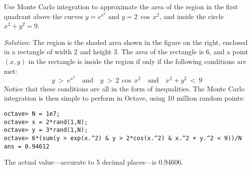 \begin{exmp}\label{exmp:montecarloarea}
\noindent Use Monte Carlo integration to approximate the area of the region
in the first quadrant above the curves $y=e^{x^2}$ and $y=2\,\cos\,x^2$, and
inside the circle $x^2+y^2=9$.\vspace{1mm}
\par\noindent\emph{Solution:} The region is the shaded area shown in the figure
on the right, enclosed in a rectangle of width $2$ and height $3$. The area of
the rectangle is $6$, and a point $(x,y)$ in the rectangle is inside the region
if only if the following conditions are met:
\[
y ~>~ e^{x^2} \quad\text{and}\quad y ~>~ 2\,\cos\,x^2 \quad\text{and}\quad
x^2 + y^2 ~<~ 9
\]
Notice that these conditions are all in the form of inequalities. The Monte
Carlo integration is then simple to perform in Octave, using 10 million random
points:

\begin{Verbatim}[frame=single, framesep=2mm,
listparameters=\setlength{\topsep}{3pt}\setlength{\partopsep}{1pt}]
octave> N = 1e7;
octave> x = 2*rand(1,N);
octave> y = 3*rand(1,N);
octave> 6*(sum(y > exp(x.^2) & y > 2*cos(x.^2) & x.^2 + y.^2 < 9))/N
ans = 0.94612
\end{Verbatim}
The actual value---accurate to 5 decimal places---is 0.94606.


\end{exmp}
